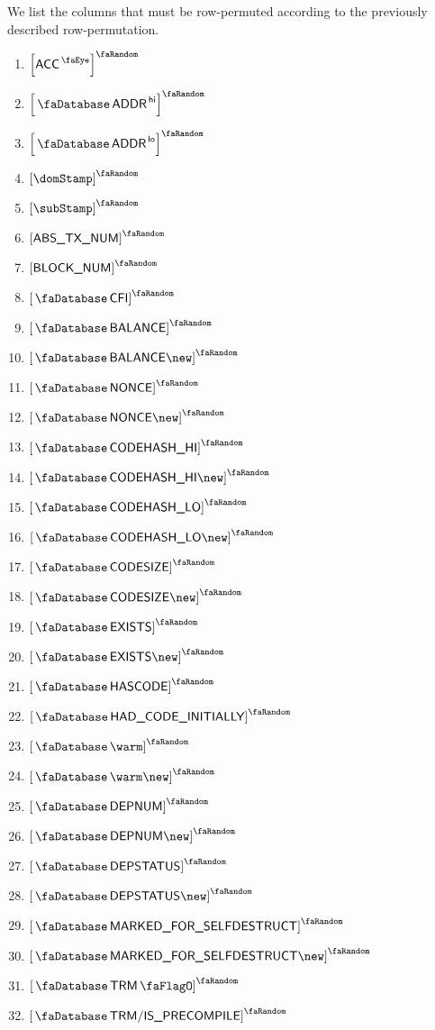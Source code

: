 We list the columns that must be row-permuted according to the previously described row-permutation.
\begin{multicols}{3}
	\begin{enumerate}
		\item $\order{\peekAccount}$
		\item $\order{\accAddress\high}$
		\item $\order{\accAddress\low}$
		\item $\order{\domStamp}$
		\item $\order{\subStamp}$
		\item $\order{\absTxNum}$
		\item $\order{\relBlockNum}$
		\item $\order{\accCfi}$
		\item $\order{\accBalance}$
		\item $\order{\accBalance\new}$
		\item $\order{\accNonce}$
		\item $\order{\accNonce\new}$
		\item $\order{\accCodehashHi}$
		\item $\order{\accCodehashHi\new}$
		\item $\order{\accCodehashLo}$
		\item $\order{\accCodehashLo\new}$
		\item $\order{\accCodesize}$
		\item $\order{\accCodesize\new}$
		\item $\order{\accExists}$
		\item $\order{\accExists\new}$
		\item $\order{\accHasCode}$
		\item $\order{\accHadCodeInitially}$
		\item $\order{\accWarmth}$
		\item $\order{\accWarmth\new}$
		\item $\order{\accDeploymentNumber}$
		\item $\order{\accDeploymentNumber\new}$
		\item $\order{\accDeploymentStatus}$
		\item $\order{\accDeploymentStatus\new}$
		\item $\order{\accMarkedForSelfdestruct}$
		\item $\order{\accMarkedForSelfdestruct\new}$
		\item $\order{\accTrmFlag}$
		\item $\order{\accTrmIsPrecompile}$
	\end{enumerate}
\end{multicols}

